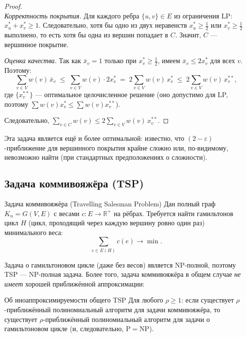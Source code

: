 \begin{proof}\\
\emph{Корректность покрытия.} Для каждого ребра $\{u,v\} \in E$ из ограничения LP: $x^*_u + x^*_v \geq 1$. Следовательно, хотя бы одно из двух неравенств $x^*_u \geq \tfrac{1}{2}$ или $x^*_v \geq \tfrac{1}{2}$ выполнено, то есть хотя бы одна из вершин попадает в $C$. Значит, $C$ — вершинное покрытие.

\emph{Оценка качества.} Так как $\bar{x}_v = 1$ только при $x^*_v \geq \tfrac{1}{2}$, имеем $\bar{x}_v \leq 2 x^*_v$ для всех $v$. Поэтому:
\[
\sum_{v \in V} w(v)\,\bar{x}_v \;\leq\; \sum_{v \in V} w(v) \cdot 2 x^*_v \;=\; 2\sum_{v \in V} w(v)\, x^*_v \;\leq\; 2\sum_{v \in V} w(v)\, x^{**}_v,
\]
где $\{x^{**}_v\}$ — оптимальное целочисленное решение (оно допустимо для LP, поэтому $\sum w(v) x^*_v \leq \sum w(v) x^{**}_v$). 

Следовательно, $\sum_{v \in C} w(v) \leq 2\sum_{v \in V} w(v)\,x^{**}_v$. 
\end{proof}

\begin{Remark}{}{}
	Эта задача является ещё и более оптимальной: известно, что $(2-\varepsilon)$-приближение для вершинного покрытия крайне сложно или, по-видимому, невозможно найти (при стандартных предположениях о сложности).
\end{Remark}

\subsection{Задача коммивояжёра (TSP)}

\begin{Definition}{Задача коммивояжёра (Travelling Salesman Problem)}{}
	Дан полный граф $K_n = G(V,E)$ с весами $c\colon E \to \mathbb{R}^+$ на рёбрах. Требуется найти гамильтонов цикл $H$ (цикл, проходящий через каждую вершину ровно один раз) минимального веса:
	\[
	\sum_{e \in E(H)} c(e) \to \min.
	\]
\end{Definition}

Задача о гамильтоновом цикле (даже без весов) является NP-полной, поэтому TSP — NP-полная задача. Более того, задача коммивояжёра в общем случае \emph{не имеет} хорошей приближённой аппроксимации:

\begin{Proposition}{Об иноаппроксимируемости общего TSP}{}
	Для любого $\rho \geq 1$: если существует $\rho$-приближённый полиномиальный алгоритм для задачи коммивояжёра, то существует $\rho$-приближённый полиномиальный алгоритм для задачи о гамильтоновом цикле (и, следовательно, $\mathrm{P} = \mathrm{NP}$).
\end{Proposition}

